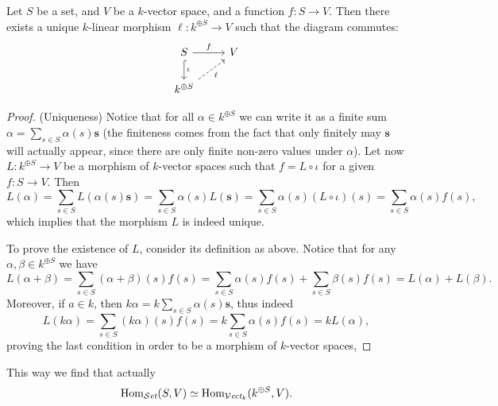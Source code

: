 \begin{proposition}
  \label{prop: universal property free vs}
  Let \(S\) be a set, and \(V\) be a \(k\)-vector space, and a function \(f : S
  \to V\). Then there exists a unique \(k\)-linear morphism \(\ell : k^{\oplus
  S} \to V\) such that the diagram commutes:
   \[
     \begin{tikzcd}
       S \ar[r, "f"] \ar[d, hook, "\iota"] &V \\
       k^{\oplus S} \ar[ru, dashed, swap, "\ell"]
     \end{tikzcd}
   \]
\end{proposition}

\begin{proof}
   (Uniqueness) Notice that for all \(\alpha \in k^{\oplus S}\) we can write it
   as a finite sum \(\alpha = \sum_{s \in S}\alpha(s) \mathbf s\) (the
   finiteness comes from the fact that only finitely may \(\mathbf s\) will
   actually appear, since there are only finite non-zero values under
   \(\alpha\)). Let now  \(L : k^{\oplus S} \to V\) be a morphism of
   \(k\)-vector spaces such that \(f = L \circ \iota\) for a given \(f : S \to
   V\). Then
   \[
      L(\alpha) = \sum_{s \in S} L(\alpha(s) \mathbf{s}) = \sum_{s \in S}
      \alpha(s) L(\mathbf s) = \sum_{s \in S} \alpha(s) (L \circ \iota)(s)
      = \sum_{s \in S} \alpha(s) f(s),
   \]
   which implies that the morphism \(L\) is indeed unique.

   To prove the existence of \(L\), consider its definition as above. Notice
   that for any \(\alpha, \beta \in k^{\oplus S}\) we have
   \[
      L(\alpha + \beta) = \sum_{s \in S} (\alpha + \beta)(s) f(s) = \sum_{s \in
      S} \alpha(s)f(s) + \sum_{s \in S} \beta(s)f(s) = L(\alpha) + L(\beta).
   \]
   Moreover, if \(a \in k\), then \(k \alpha = k\sum_{s \in S} \alpha(s)
   \mathbf s\), thus indeed
   \[
      L(k \alpha) = \sum_{s \in S} (k \alpha)(s) f(s) = k \sum_{s \in S}
      \alpha(s) f(s) = k L(\alpha),
   \]
   proving the last condition in order to be a morphism of \(k\)-vector spaces,
\end{proof}

This way we find that actually
\[
   \operatorname{Hom}_{{\mathcal{S}\textit{et}}}(S, V) \simeq \operatorname{Hom}_{{\mathcal{V}\textit{ect}}_k}(k^{\oplus S}, V).
\]

